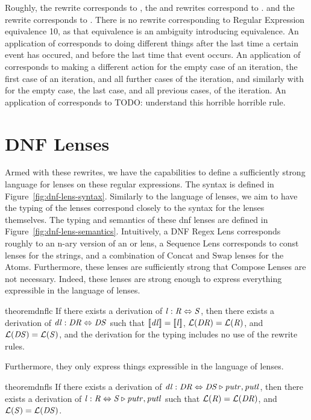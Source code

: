 Roughly, the \AtomSumstarRule{} rewrite corresponds to \SumstarRule{},
the \AtomUnrollstarLeftRule{} and \AtomUnrollstarRightRule{} rewrites correspond to \ProductstarRule{}.
and the \DicyclicRewriteStarRule{} rewrite corresponds to \DicyclicityRule{}.
There is no rewrite corresponding to Regular Expression equivalence 10, as that
equivalence is an ambiguity introducing equivalence.
An application of \AtomSumstarRule{} corresponds to doing different things after the last time a certain event has occured, and before the last time that event occurs.
An application of \AtomUnrollstarLeftRule{} corresponds to making a different action for
the empty case of an iteration, the first case of an iteration, and all further cases of the iteration,
and similarly with \AtomUnrollstarRightRule{} for the empty case, the last case, and all previous cases, of the iteration.
An application of \DicyclicRewriteStarRule{} corresponds to TODO: understand this
horrible horrible rule.

\section{DNF Lenses}


Armed with these rewrites, we have the capabilities to define a sufficiently
strong language for lenses on these regular expressions.
The syntax is defined in Figure~\ref{fig:dnf-lens-syntax}.
Similarly to the language of lenses, we aim to have the typing of the lenses
correspond closely to the syntax for the lenses themselves.
The typing and semantics of these dnf lenses are defined in Figure~\ref{fig:dnf-lens-semantics}.
Intuitively, a DNF Regex Lens corresponds roughly to an n-ary version of an or lens,
a Sequence Lens corresponds to const lenses for the strings, and a combination of
Concat and Swap lenses for the Atoms.
Furthermore, these lenses are sufficiently strong that Compose Lenses are not
necessary.
Indeed, these lenses are strong enough to express everything expressible in the language of lenses.
\begin{restatable}{theorem}{dnflc}
\label{thm:completeness-dnf-lenses}
If there exists a derivation of $\mathit{l} : \mathit{R} \Leftrightarrow \mathit{S}$,
then there exists a derivation of $\mathit{dl} : \mathit{DR} \Leftrightarrow \mathit{DS}$ such that
$[ \! [\mathit{dl}] \! ]=[ \! [\mathit{l}] \! ]$,
$\mathcal{L}(\mathit{DR})=\mathcal{L}(\mathit{R})$, and
$\mathcal{L}(\mathit{DS})=\mathcal{L}(\mathit{S})$,
and the derivation for the typing includes no use of the rewrite rules.
\end{restatable}

Furthermore, they only express things expressible in the language of lenses.
\begin{restatable}{theorem}{dnfls}
\label{thm:dnfls}
If there exists a derivation of $\mathit{dl} : \mathit{DR} \Leftrightarrow \mathit{DS} \triangleright \mathit{putr},\mathit{putl}$,
then there exists a derivation of $\mathit{l} : \mathit{R} \Leftrightarrow \mathit{S} \triangleright \mathit{putr},\mathit{putl}$ such that
$\mathcal{L}(\mathit{R})=\mathcal{L}(\mathit{DR})$, and
$\mathcal{L}(\mathit{S})=\mathcal{L}(\mathit{DS})$.
\end{restatable}


